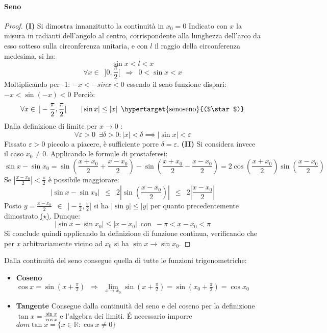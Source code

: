 \documentclass[10pt]{article}
\theoremstyle{plain}
\begin{document}
\paragraph{Seno}
\begin{proof}
\textbf{(I)} Si dimostra innanzitutto la continuità in $x_0 = 0$ \newline 
Indicato con $x$ la misura in radianti dell'angolo al centro, corrispondente alla lunghezza dell'arco da esso sotteso sulla circonferenza unitaria, e con $l$ il raggio della circonferenza medesima, si ha:
\[\sin x < l < x\]
\[\forall x \in \enspace ]0,\frac{\pi}{2}[ \enspace \Longrightarrow \enspace 0 < \sin x < x\]
Moltiplicando per -1: $-x < -sinx < 0$ essendo il seno funzione dispari: $-x < \sin (-x) < 0$ Perciò:
\[\forall x \in \enspace ]-\frac{\pi}{2}, \frac{\pi}{2}[ \quad \quad |\sin x| \leq |x| \enspace \textrm{\hypertarget{senoseno}{($\star$)}} \]
Dalla definizione di limite per $x \longrightarrow 0$ :
\[\forall \varepsilon >0 \enspace \exists \delta > 0 : |x| < \delta \implies |\sin x| < \varepsilon\]
Fissato $\varepsilon > 0$ piccolo a piacere, è sufficiente porre $\delta = \varepsilon$. \newline
\textbf{(II)} Si considera invece il caso $x_0 \neq 0$. Applicando le formule di prostaferesi:
\[\sin x - \sin x_0 = \sin (\frac{x + x_0}{2} + \frac{x - x_0}{2}) - \sin (\frac{x + x_0}{2} - \frac{x - x_0}{2}) = 2 \cos (\frac{x + x_0}{2}) \sin (\frac{x - x_0}{2})\]
Se $|\frac{x - x_0}{2}| < \frac{\pi}{2}$ è possibile maggiorare:
\[|\sin x - \sin x_0| \enspace \leq \enspace 2 |\sin (\frac{x - x_0}{2})| \enspace \leq \enspace 2|\frac{x - x_0}{2}|\]
Posto $y = \frac{x - x_0}{2} \enspace \in \enspace ]-\frac{\pi}{2}, \frac{\pi}{2}[$ si ha $|\sin y| \leq |y|$ per quanto precedentemente dimostrato \hyperlink{senoseno}{($\star$)}. Dunque:
\[|\sin x - \sin x_0| \leq |x - x_0| \enspace \textrm{con} \enspace -\pi < x - x_0 < \pi\]
Si conclude quindi applicando la definizione di funzione continua, verificando che per $x$ arbitrariamente vicino ad $x_0$ si ha $\sin x \longrightarrow \sin x_0$.
\end{proof}
Dalla continuità del seno consegue quella di tutte le funzioni trigonometriche:
\begin{itemize}[label=$\ast$]
\item \textbf{Coseno} $\cos x = \sin (x + \frac{\pi}{2}) \enspace \Rightarrow \enspace \lim \limits_{x \rightarrow x_0} \sin (x + \frac{\pi}{2}) = \sin (x_0 + \frac{\pi}{2}) = \cos x_0$
\item \textbf{Tangente} Consegue dalla continuità del seno e del coseno per la definizione $\tan x = \frac{\sin x}{\cos x}$ e l'algebra dei limiti. \'E necessario imporre $dom \tan x = \{x \in \mathbb{R} : \cos x \neq 0\}$
\end{itemize}
\end{document}
